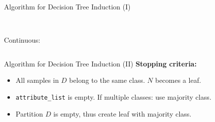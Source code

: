 \begin{frame}{Algorithm for Decision Tree Induction (I)}
\begin{columns}
\begin{column}{0.25\textwidth}
			~ \\\bigskip
			Continuous:
			\begin{figure}[t]
				\centering
				
			\end{figure}

		\end{column}
	\end{columns}


\end{frame}

\begin{frame}{Algorithm for Decision Tree Induction (II)}
	\textbf{Stopping criteria:}
	\begin{itemize}
		\item All samples in $D$ belong to the same class. $N$ becomes a leaf.
		\item \texttt{attribute\_list} is empty. If multiple classes: use majority class.
		\item Partition $D$ is empty, thus create leaf with majority class.
	\end{itemize}
\end{frame}


